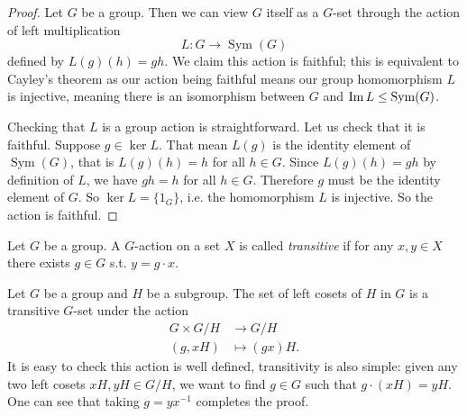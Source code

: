 \begin{proof}
    Let $G$ be a group. Then we can view $G$ itself as a $G$-set through the  action of left multiplication
    $$
    L: G \rightarrow \operatorname{Sym}(G)
    $$
    defined by $L(g)(h)=g h$. 
    We claim this action is faithful; this is equivalent to Cayley's theorem as our action being faithful means our group homomorphism $L$ is injective, meaning there is an isomorphism between $G$ and $\operatorname{Im} L \leq \operatorname{Sym}(G)$.

    
    Checking that $L$ is a group action is straightforward. Let us check that it is faithful. Suppose $g \in \ker L$. That mean $L(g)$ is the identity element of $\operatorname{Sym}(G)$, that is $L(g)(h)=h$ for all $h \in G$. Since $L(g)(h)=g h$ by definition of $L$, we have $g h=h$ for all $h \in G$. Therefore $g$ must be the identity element of $G$. So $\ker L=\{1_G\}$, i.e. the homomorphism $L$ is injective. So the action is faithful.
\end{proof}

\begin{definition}
  Let $G$ be a group. A $G$-action on a set $X$ is called \emph{transitive} if for any $x,y\in X$
  there exists $g\in G$ s.t. $y=g\cdot x$.
  \label{def:transitiveAction}
\end{definition}

\begin{example}
  Let $G$ be a group and $H$ be a subgroup. The set of left cosets of $H$ in $G$ is a
  transitive $G$-set under the action
  \begin{align*}
      G\times G/H &\to G/H
      \\ (g,xH)&\mapsto (gx)H.
  \end{align*}
  It is easy to check this action is well defined, transitivity is also simple: given any two left cosets $xH,yH\in G/H$, we want to find $g \in G$ such that $g \cdot (xH) = yH$. One can see that taking $g=yx^{-1}$ completes the proof.
\end{example}


